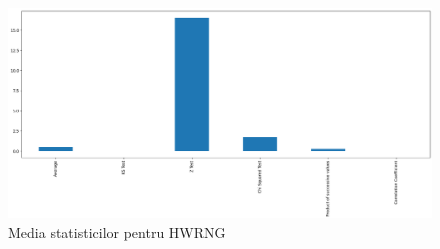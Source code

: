 \begin{figure}[H]
    \centering
    \includegraphics[width=1.0\textwidth]{continut/capitol4/figuri/StatsHWRNG.png}
    \caption{Media statisticilor pentru HWRNG}
    \label{fig:StatsBarHWRNG}
\end{figure}
\newpage

